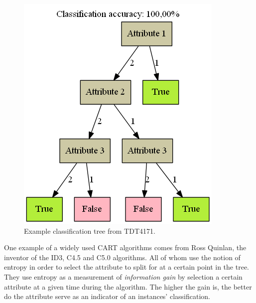 	\begin{figure}[H]%
		\includegraphics[width=\columnwidth]{images/TrivialDecisionTree.png}%
		\caption{Example classification tree from TDT4171. }%
		\label{fig:decisiontree}%
	\end{figure}
	
	\bigskip\noindent
	One example of a widely used CART algorithms comes from Ross Quinlan, the inventor of the ID3, C4.5 and C5.0 algorithms. \cite{quinlan:id3, quinlan:c45}
	All of whom use the notion of entropy in order to select the attribute to split for at a certain point in the tree. 
	They use entropy as a measurement of \textit{information gain} by selection a certain attribute at a given time during the algorithm. 
	The higher the gain is, the better do the attribute serve as an indicator of an instances' classification. 
	
